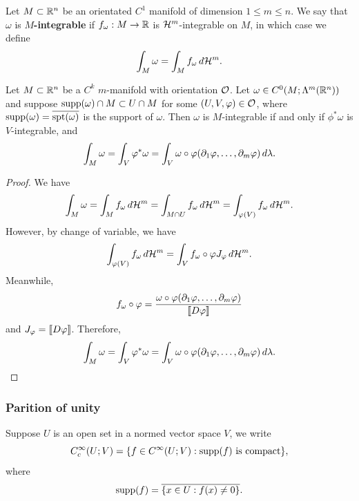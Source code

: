 \documentclass[a4paper]{article}
\begin{document}
\begin{defi}
  Let $M \subset \mathbb{R}^n$ be an orientated $C^1$ manifold of dimension $1
    \leq m \leq n$. We say that $\omega$ is \textbf{$M$-integrable} if
  $f_\omega : M \to \mathbb{R}$ is $\mathcal{H}^m$-integrable on $M$, in which case we
  define
  \[
    \int_M \omega = \int_M f_\omega \, d \mathcal{H}^m.
  \]
\end{defi}

\begin{prop}
  Let $M \subset \mathbb{R}^n$ be a $C^k$ $m$-manifold with orientation $\mathcal{O}$.
  Let $\omega \in C^0(M ; \Lambda^m(\mathbb{R}^n))$ and suppose $\operatorname{supp}(\omega)
    \cap M \subset U \cap M$ for some $(U, V, \varphi) \in \mathcal{O}$, where
  $\operatorname{supp}(\omega) = \overline{\operatorname{spt}(\omega)}$ is the support of $\omega$. Then
  $\omega$ is $M$-integrable if and only if $\phi^* \omega$ is
  $V$-integrable, and
  \[
    \int_M \omega = \int_V \varphi^* \omega =
    \int_V \omega \circ \varphi (\partial_1 \varphi, \dots, \partial_m \varphi)
    \, d \lambda.
  \]
\end{prop}

\begin{proof}
  We have
  \[
    \begin{aligned}
      \int_M \omega = \int_M f_\omega \, d \mathcal{H}^m
      = \int_{M \cap U} f_\omega \, d \mathcal{H}^m
      = \int_{\varphi(V)} f_\omega \, d \mathcal{H}^m.
    \end{aligned}
  \]
  However, by change of variable, we have
  \[
    \int_{\varphi(V)} f_\omega \, d \mathcal{H}^m
    = \int_V f_\omega \circ \varphi J_\varphi \, d \mathcal{H}^m.
  \]
  Meanwhile,
  \[
    f_\omega \circ \varphi =
    \frac{\omega \circ \varphi (\partial_1 \varphi, \dots, \partial_m \varphi)}
    {\left\llbracket D \varphi \right\rrbracket}
  \]
  and $J_\varphi = \left\llbracket D \varphi \right\rrbracket$. Therefore,
  \[
    \int_M \omega = \int_V \varphi^* \omega =
    \int_V \omega \circ \varphi (\partial_1 \varphi, \dots, \partial_m \varphi)
    \, d \lambda.
  \]
\end{proof}

\subsubsection{Parition of unity}

\begin{defi}
  Suppose $U$ is an open set in a normed vector space $V$, we write
  \[
    C_c^\infty (U; V) = \{f \in C^\infty (U; V):
    \text{$\operatorname{supp}(f)$ is compact}\},
  \]
  where
  \[
    \operatorname{supp}(f) = \overline{\{x \in U : f(x) \neq 0\}}.
  \]
\end{defi}
\end{document}
